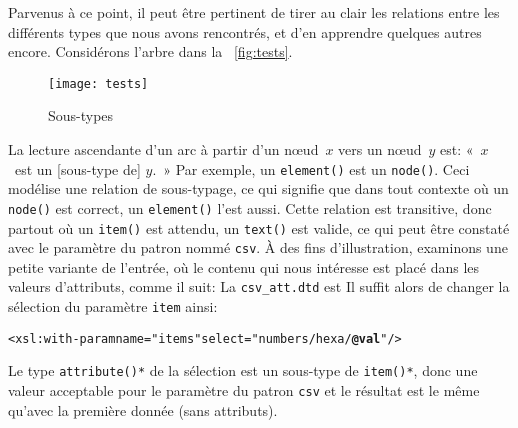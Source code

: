 Parvenus à ce point, il peut être pertinent de tirer au clair les
relations entre les différents types que nous avons rencontrés, et d'en
apprendre quelques autres encore. Considérons l'arbre dans la \fig~\vref{fig:tests}.
\begin{figure}
\texttt{[image: tests]}
\caption{Sous-types \XPath\label{fig:tests}}
\end{figure}
La lecture ascendante d'un arc à partir d'un n{\oe}ud~\(x\) vers un
n{\oe}ud~\(y\) est: «~\(x\)~est un [sous-type de] \(y\).~» Par exemple,
un \texttt{element()} est un \texttt{node()}. Ceci modélise une
relation de sous-typage, ce qui signifie que dans tout contexte où un
\texttt{node()} est correct, un \texttt{element()} l'est aussi. Cette
relation est transitive, donc partout où un \texttt{item()} est
attendu, un \texttt{text()} est valide, ce qui peut être constaté avec
le paramètre du patron nommé \texttt{csv}. À des fins d'illustration,
examinons une petite variante de l'entrée, où le contenu qui nous
intéresse est placé dans les valeurs d'attributs, comme il suit:
\noindent La \DTD \texttt{csv\_att.dtd} est
\noindent Il suffit alors de changer la sélection du paramètre
\texttt{item} ainsi:
\begin{alltt}
\small      <xsl:with-param name="items" select="numbers/hexa/\textbf{@val}"/>
\end{alltt}
Le type \texttt{attribute()*} de la sélection est un sous-type de
\texttt{item()*}, donc une valeur acceptable pour le paramètre du
patron \texttt{csv} et le résultat est le même qu'avec la première
donnée \XML (sans attributs).


